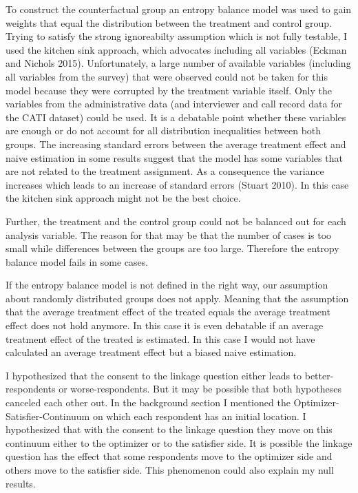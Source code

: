 To construct the counterfactual group an entropy balance model was used to gain weights that equal the distribution between the treatment and control group. Trying to satisfy the strong ignoreabilty assumption which is not fully testable, I used the kitchen sink approach, which advocates including all variables (Eckman and Nichols 2015). Unfortunately, a large number of available variables (including all variables from the survey) that were observed could not be taken for this model because they were corrupted by the treatment variable itself. Only the variables from the administrative data (and interviewer and call record data for the CATI dataset) could be used. It is a debatable point whether these variables are enough or do not account for all distribution inequalities between both groups. The increasing standard errors between the average treatment effect and naive estimation in some results suggest that the model has some variables that are not related to the treatment assignment. As a consequence the variance increases which leads to an increase of standard errors (Stuart 2010). In this case the kitchen sink approach might not be the best choice.

Further, the treatment and the control group could not be balanced out for each analysis variable. The reason for that may be that the number of cases is too small while differences between the groups are too large. Therefore the entropy balance model fails in some cases. 

If the entropy balance model is not defined in the right way, our assumption about randomly distributed groups does not apply. Meaning that the assumption that the average treatment effect of the treated equals the average treatment effect does not hold anymore. In this case it is even debatable if an average treatment effect of the treated is estimated. In this case I would not have calculated an average treatment effect but a biased naive estimation. 

I hypothesized that the consent to the linkage question either leads to better-respondents or worse-respondents. But it may be possible that both hypotheses canceled each other out. In the background section I mentioned the Optimizer-Satisfier-Continuum on which each respondent has an initial location. I hypothesized that with the consent to the linkage question they move on this continuum either to the optimizer or to the satisfier side. It is possible the linkage question has the effect that some respondents move to the optimizer side and others move to the satisfier side. This phenomenon could also explain my null results.

